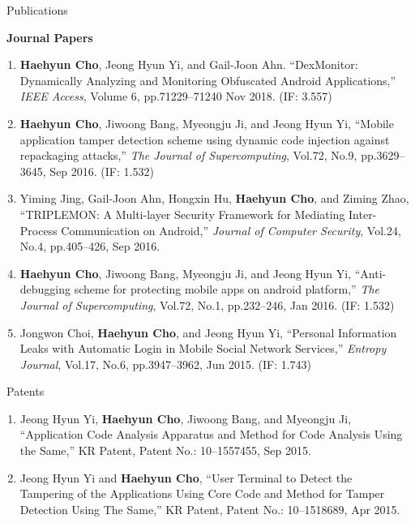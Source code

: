 \documentclass{resume} %
\makeatletter
\newlength{\bibhang}
\newlength{\bibsep}
{\@listi \global\bibsep\itemsep \global\advance\bibsep by\parsep}
\newenvironment{bibsection}%
{\begin{enumerate}{}{%
			\setlength{\leftmargin}{\bibhang}%
			\setlength{\itemindent}{-\leftmargin}%
			\setlength{\itemsep}{\bibsep}%
			\setlength{\parsep}{\z@}%
			\setlength{\partopsep}{0pt}%
			\setlength{\topsep}{0pt}}}
	{\end{enumerate}\vspace{-.6\baselineskip}}
\makeatother
\begin{document}
\begin{rSection}{\faGenderless~Publications}
	\vspace{3mm}
	\strut\textbullet~{\bf Journal Papers}
	\begin{bibsection}
		\item {\bf Haehyun Cho}, Jeong Hyun Yi, and Gail-Joon Ahn.
        ``DexMonitor: Dynamically Analyzing and Monitoring Obfuscated Android Applications,'' 
        \emph{IEEE Access},
        Volume 6, pp.71229--71240
        Nov 2018. (IF: 3.557)

		\item {\bf Haehyun Cho}, Jiwoong Bang, Myeongju Ji, and Jeong Hyun Yi, 
		``Mobile application tamper detection scheme using dynamic code injection against repackaging attacks,'' 
		\emph{The Journal of Supercomputing}, 
		Vol.72, No.9, pp.3629--3645, Sep 2016. (IF: 1.532)

		\item Yiming Jing, Gail-Joon Ahn, Hongxin Hu, {\bf Haehyun Cho}, and Ziming Zhao,
		``TRIPLEMON: A Multi-layer Security Framework for Mediating Inter-Process Communication on Android,'' 
		\emph{Journal of Computer Security}, 
		Vol.24, No.4, pp.405--426, Sep 2016.

		\item {\bf Haehyun Cho}, Jiwoong Bang, Myeongju Ji, and Jeong Hyun Yi, 
		``Anti-debugging scheme for protecting mobile apps on android platform,'' 
		\emph{The Journal of Supercomputing}, 
		Vol.72, No.1, pp.232--246, Jan 2016. (IF: 1.532)

		\item Jongwon Choi, {\bf Haehyun Cho}, and Jeong Hyun Yi, 
		``Personal Information Leaks with Automatic Login in Mobile Social Network Services,'' 
		\emph{Entropy Journal}, 
		Vol.17, No.6, pp.3947--3962, Jun 2015. (IF: 1.743)
	\end{bibsection}
	
	\vspace{5mm}
\end{rSection}

\begin{rSection}{\faGenderless~Patents}
	
	\begin{bibsection}
		\item Jeong Hyun Yi, {\bf Haehyun Cho}, Jiwoong Bang, and Myeongju Ji,
		``Application Code Analysis Apparatus and Method for Code Analysis Using the Same,'' KR Patent, 
		Patent No.: 10--1557455, Sep 2015.

		\item Jeong Hyun Yi and {\bf Haehyun Cho}, 
		``User Terminal to Detect the Tampering of the Applications Using Core Code and Method for Tamper Detection Using The Same,'' KR Patent, 
		Patent No.: 10--1518689, Apr 2015.
	\end{bibsection}
	
	\vspace{5mm}
\end{rSection}
\end{document}
